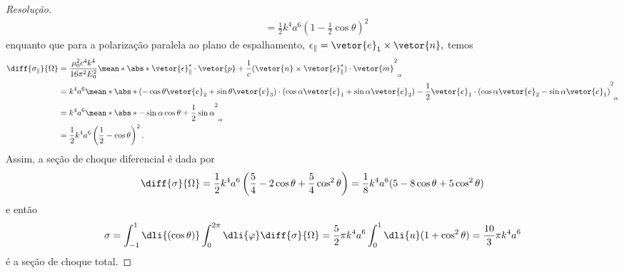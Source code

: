 \begin{proof}[Resolução]
\begin{align*}
                                    &= \frac12 k^4 a^6 \left(1 - \frac12 \cos\theta\right)^2
   \end{align*}
   enquanto que para a polarização paralela ao plano de espalhamento, \(\epsilon_{\parallel} = \vetor{e}_1 \times \vetor{n},\) temos
   \begin{align*}
      \diff{\sigma_{\parallel}}{\Omega} &= \frac{\mu_0^2 c^4 k^4}{16 \pi^2 E_0^2}\mean*{\abs*{\vetor{\epsilon}_{\parallel}^* \cdot \vetor{p} + \frac1c (\vetor{n} \times \vetor{\epsilon}_{\parallel}^*)\cdot \vetor{m}}^2}_{\alpha}\\
                                        &= k^4 a^6 \mean*{\abs*{(-\cos\theta \vetor{e}_2 + \sin\theta\vetor{e}_3) \cdot (\cos \alpha \vetor{e}_1 + \sin\alpha \vetor{e}_2) - \frac12 \vetor{e}_1\cdot (\cos \alpha \vetor{e}_2 - \sin\alpha \vetor{e}_1)}^2}_{\alpha}\\
                                    &= k^4 a^6 \mean*{\abs*{-\sin \alpha \cos\theta + \frac12 \sin \alpha}^2}_\alpha\\
                                    &= \frac12 k^4 a^6 \left(\frac12 - \cos\theta\right)^2.
   \end{align*}
   Assim, a seção de choque diferencial é dada por
   \begin{equation*}
      \diff{\sigma}{\Omega} = \frac12 k^4 a^6\left(\frac54 - 2\cos\theta + \frac54\cos^2\theta\right) = \frac18 k^4 a^6 (5 - 8 \cos\theta + 5\cos^2\theta)
   \end{equation*}
   e então
   \begin{equation*}
      \sigma = \int_{-1}^1\dli{(\cos\theta)}\int_0^{2\pi} \dli{\varphi} \diff{\sigma}{\Omega} = \frac52\pi k^4 a^6\int_0^1 \dli{u} (1 + \cos^2\theta) = \frac{10}3\pi k^4 a^6 
   \end{equation*}
   é a seção de choque total.


\end{proof}
